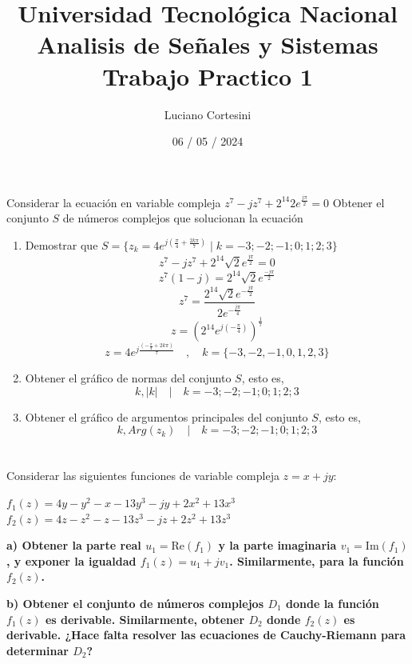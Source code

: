 \documentclass[12pt]{report}
\title{%
  \fontsize{25}{0}\selectfont Universidad Tecnológica Nacional \\
  \fontsize{22}{30}\selectfont Analisis de Señales y Sistemas \\
  \fontsize{20}{25}\selectfont Trabajo Practico 1
}
\author{Luciano Cortesini}
\date{06 / 05 / 2024}
\begin{document}
\maketitle

\chapter{}
Considerar la ecuación en variable compleja $z^7-jz^7+2^{14}2e^{\frac{j\pi}{2}}=0$
Obtener el conjunto $S$ de números complejos que solucionan la ecuación

\begin{enumerate}
  \item Demostrar que  $S = \{z_k = 4e^{j(\frac{\pi}{4}+\frac{2k\pi}{7})} \mid k=-3;-2;-1;0;1;2;3\}$
    $$z^7 - jz^7 + 2^{14}\sqrt{2}e^{\frac{j\pi}{2}} = 0$$
    $$z^7(1-j) = 2^{14}\sqrt{2}e^{\frac{-j\pi}{2}}$$
    $$z^7 = \frac{2^{14}\sqrt{2}e^{-\frac{j\pi}{2}}} {2e^{-\frac{j\pi}{4}}}$$
    $$z = (2^{14}e^{j(-\frac{\pi} {4})})^{\frac{1}{7}}$$
    $$z = 4e^{j\frac{(-\frac{\pi}{4}+2k\pi)}{7}} \quad,\quad k = \{-3,-2,-1,0,1,2,3\}$$

  \item Obtener el gráfico de normas del conjunto $S$, esto es,
    $$k, |k| \quad | \quad k = -3;-2;-1;0;1;2;3 $$

  \item Obtener el gráfico de argumentos principales del conjunto $S$, esto es,
    $$k, Arg(z_k) \quad | \quad k = -3;-2;-1;0;1;2;3 $$

\end{enumerate}

\chapter{}
Considerar las siguientes funciones de variable compleja $z = x + jy$:
\begin{center}
    $f_1(z) = 4y - y^2 - x - 13y^3 - jy + 2x^2 + 13x^3$ \\[10pt]
    $f_2(z) = 4z - z^2 - z - 13z^3 - jz + 2z^2 + 13z^3$
\end{center}

\textbf{a) Obtener la parte real $u_1 = \text{Re}(f_1)$ y la parte imaginaria $v_1 = \text{Im}(f_1)$, y exponer la igualdad $f_1(z) = u_1 + jv_1$. Similarmente, para la función $f_2(z)$.}

\textbf{b) Obtener el conjunto de números complejos $D_1$ donde la función $f_1(z)$ es derivable. Similarmente, obtener $D_2$ donde $f_2(z)$ es derivable. ¿Hace falta resolver las ecuaciones de Cauchy-Riemann para determinar $D_2$?}
\end{document}
